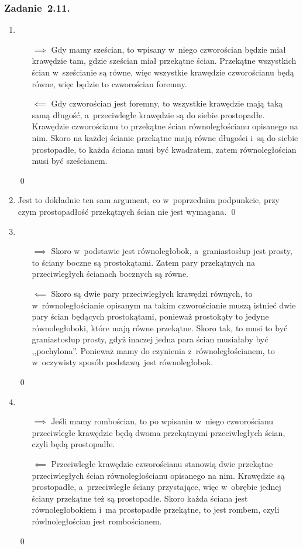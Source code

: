 \subsubsection*{Zadanie~2.11.}
\begin{enumerate}[label={\alph*)}]
    \item
        \begin{itemize}
            \item[\(\implies\)] Gdy mamy sześcian, to wpisany w~niego czworościan będzie miał krawędzie tam, gdzie sześcian miał przekątne ścian. Przekątne wszystkich ścian w~sześcianie są równe, więc wszystkie krawędzie czworościanu będą równe, więc będzie to czworościan foremny.
            \item[\(\impliedby\)] Gdy czworościan jest foremny, to wszystkie krawędzie mają taką samą długość, a~przeciwległe krawędzie są do siebie prostopadłe. Krawędzie czworościanu to przekątne ścian równoległościanu opisanego na nim. Skoro na każdej ścianie przekątne mają równe długości i~są do siebie prostopadłe, to każda ściana musi być kwadratem, zatem równoległościan musi być sześcianem.
        \end{itemize}
        \qed
    \item Jest to dokładnie ten sam argument, co w~poprzednim podpunkcie, przy czym prostopadłość przekątnych ścian nie jest wymagana.
        \qed
    \item
        \begin{itemize}
            \item[\(\implies\)] Skoro w~podstawie jest równoległobok, a~graniastosłup jest prosty, to ściany boczne są prostokątami. Zatem pary przekątnych na przeciwległych ścianach bocznych są równe.
            \item[\(\impliedby\)] Skoro są dwie pary przeciwległych krawędzi równych, to w~równoległościanie opisanym na takim czworościanie muszą istnieć dwie pary ścian będących prostokątami, ponieważ prostokąty to jedyne równoległoboki, które mają równe przekątne. Skoro tak, to musi to być graniastosłup prosty, gdyż inaczej jedna para ścian musiałaby być ,,pochylona''. Ponieważ mamy do czynienia z~równoległościanem, to w~oczywisty sposób podstawą jest równoległobok.
        \end{itemize}
        \qed
    \item
        \begin{itemize}
            \item[\(\implies\)] Jeśli mamy rombościan, to po wpisaniu w~niego czworościanu przeciwległe krawędzie będą dwoma przekątnymi przeciwległych ścian, czyli będą prostopadłe.
            \item[\(\impliedby\)] Przeciwległe krawędzie czworościanu stanowią dwie przekątne przeciwległych ścian równoległościanu opisanego na nim. Krawędzie są prostopadłe, a~przeciwległe ściany przystające, więc w~obrębie jednej ściany przekątne też są prostopadłe. Skoro każda ściana jest równoległobokiem i~ma prostopadłe przekątne, to jest rombem, czyli rówlnoległościan jest rombościanem.
        \end{itemize}
        \qed
\end{enumerate}
